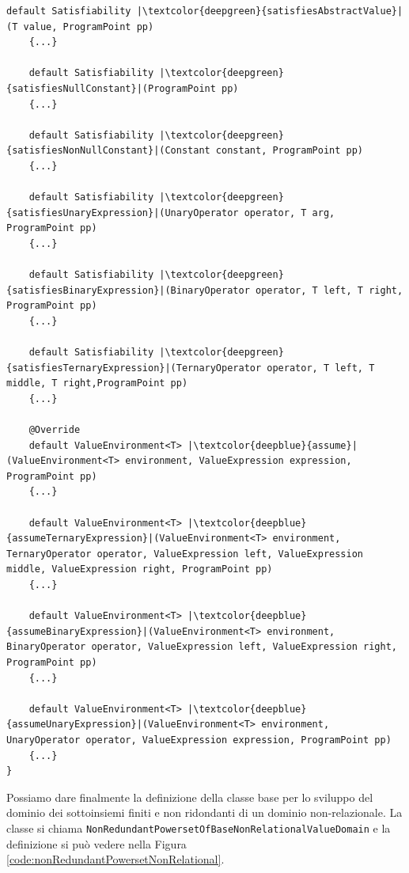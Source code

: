 \begin{lstlisting}[belowskip=-1.1 \baselineskip, escapechar=|]
    default Satisfiability |\textcolor{deepgreen}{satisfiesAbstractValue}|(T value, ProgramPoint pp) 
    {...}
    
    default Satisfiability |\textcolor{deepgreen}{satisfiesNullConstant}|(ProgramPoint pp)
    {...}
    
    default Satisfiability |\textcolor{deepgreen}{satisfiesNonNullConstant}|(Constant constant, ProgramPoint pp) 
    {...}
    
    default Satisfiability |\textcolor{deepgreen}{satisfiesUnaryExpression}|(UnaryOperator operator, T arg, ProgramPoint pp) 
    {...}
    
    default Satisfiability |\textcolor{deepgreen}{satisfiesBinaryExpression}|(BinaryOperator operator, T left, T right, ProgramPoint pp) 
    {...}

    default Satisfiability |\textcolor{deepgreen}{satisfiesTernaryExpression}|(TernaryOperator operator, T left, T middle, T right,ProgramPoint pp) 
    {...}
    
    @Override
    default ValueEnvironment<T> |\textcolor{deepblue}{assume}|(ValueEnvironment<T> environment, ValueExpression expression, ProgramPoint pp) 
    {...}
    
    default ValueEnvironment<T> |\textcolor{deepblue}{assumeTernaryExpression}|(ValueEnvironment<T> environment, TernaryOperator operator, ValueExpression left, ValueExpression middle, ValueExpression right, ProgramPoint pp) 
    {...}
    
    default ValueEnvironment<T> |\textcolor{deepblue}{assumeBinaryExpression}|(ValueEnvironment<T> environment, BinaryOperator operator, ValueExpression left, ValueExpression right, ProgramPoint pp) 
    {...}
    
    default ValueEnvironment<T> |\textcolor{deepblue}{assumeUnaryExpression}|(ValueEnvironment<T> environment, UnaryOperator operator, ValueExpression expression, ProgramPoint pp) 
    {...}
}
\end{lstlisting}

Possiamo dare finalmente la definizione della classe base per lo sviluppo del dominio dei sottoinsiemi finiti e non ridondanti di un dominio non-relazionale. La classe si chiama \texttt{NonRedundantPowersetOfBaseNonRelationalValueDomain} e la definizione si può vedere nella Figura \ref{code:nonRedundantPowersetNonRelational}. 

